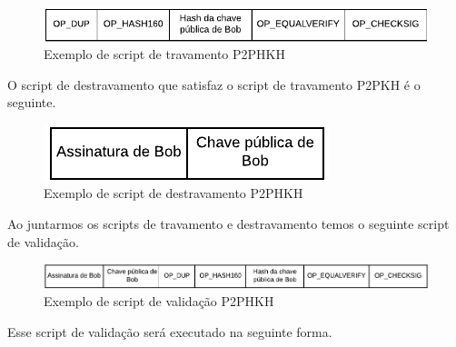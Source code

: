 \documentclass[conference,compsoc]{IEEEtran}
\begin{document}
\begin{figure}[H]
    \centering
    \includegraphics[keepaspectratio=true, scale=0.7]{img/P2PHKH_script_travamento.pdf}
    \caption{Exemplo de script de travamento P2PHKH}
    \label{fig:P2PKH_Travamento}
\end{figure}

O script de destravamento que satisfaz o script de travamento P2PKH é o seguinte.

\begin{figure}[H]
    \centering
    \includegraphics[keepaspectratio=true, scale=0.8]{img/P2PHKH_script_destravamento.pdf}
    \caption{Exemplo de script de destravamento P2PHKH}
    \label{fig:P2PKH_Destravamento}
\end{figure}

Ao juntarmos os scripts de travamento e destravamento temos o seguinte script de validação.

\begin{figure}[H]
    \centering
    \includegraphics[keepaspectratio=true, scale=0.47]{img/P2PHKH_script_validacao.pdf}
    \caption{Exemplo de script de validação P2PHKH}
    \label{fig:P2PKH_Validacao}
\end{figure}

Esse script de validação será executado na seguinte forma.
\end{document}
